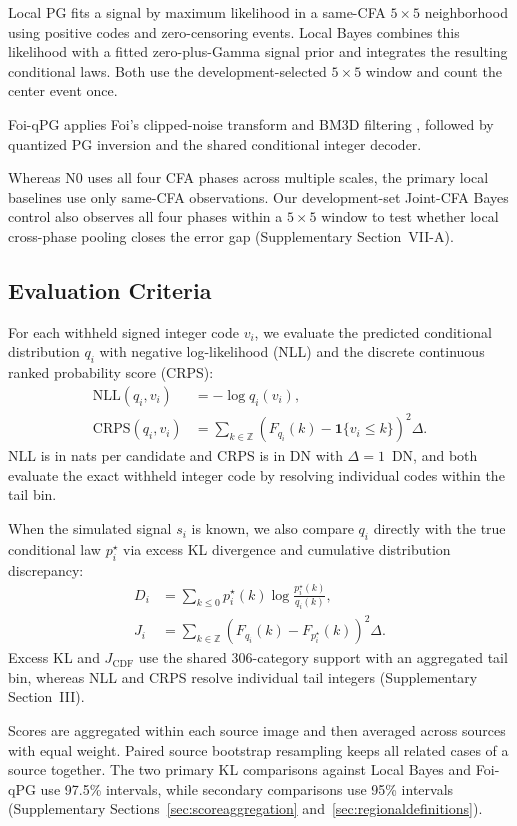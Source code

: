 \documentclass[10pt,twocolumn,journal]{IEEEtran}
\begin{document}
Local PG fits a signal by maximum likelihood in a same-CFA $5\times5$ neighborhood using positive codes and zero-censoring events. Local Bayes combines this likelihood with a fitted zero-plus-Gamma signal prior and integrates the resulting conditional laws. Both use the development-selected $5\times5$ window and count the center event once.

Foi-qPG applies Foi's clipped-noise transform \cite{foi2009} and BM3D filtering \cite{bm3d}, followed by quantized PG inversion and the shared conditional integer decoder.

Whereas N0 uses all four CFA phases across multiple scales, the primary local baselines use only same-CFA observations. Our development-set Joint-CFA Bayes control also observes all four phases within a $5\times5$ window to test whether local cross-phase pooling closes the error gap (Supplementary Section~VII-A).

\subsection{Evaluation Criteria}
For each withheld signed integer code $v_i$, we evaluate the predicted conditional distribution $q_i$ with negative log-likelihood (NLL) and the discrete continuous ranked probability score (CRPS):
\begin{align}
\mathrm{NLL}(q_i,v_i)&=-\log q_i(v_i),\label{eq:nll}\\
\mathrm{CRPS}(q_i,v_i)&=\sum_{k\in\mathbb Z}
\left(F_{q_i}(k)-\mathbf{1}\{v_i\leq k\}\right)^2\Delta.\label{eq:crps}
\end{align}
NLL is in nats per candidate and CRPS is in DN with $\Delta=1$~DN, and both evaluate the exact withheld integer code by resolving individual codes within the tail bin.

When the simulated signal $s_i$ is known, we also compare $q_i$ directly with the true conditional law $p_i^\star$ via excess KL divergence and cumulative distribution discrepancy:
\begin{align}
D_i&=\sum_{k\leq0}p^{\star}_i(k)\log\frac{p^{\star}_i(k)}{q_i(k)},\label{eq:kl}\\
J_i&=\sum_{k\in\mathbb Z}\left(F_{q_i}(k)-F_{p^{\star}_i}(k)\right)^2\Delta.\label{eq:cdf}
\end{align}
Excess KL and $J_{\mathrm{CDF}}$ use the shared 306-category support with an aggregated tail bin, whereas NLL and CRPS resolve individual tail integers (Supplementary Section~III).

Scores are aggregated within each source image and then averaged across sources with equal weight. Paired source bootstrap resampling keeps all related cases of a source together. The two primary KL comparisons against Local Bayes and Foi-qPG use 97.5\% intervals, while secondary comparisons use 95\% intervals (Supplementary Sections~\ref{sec:scoreaggregation} and~\ref{sec:regionaldefinitions}).
\end{document}
